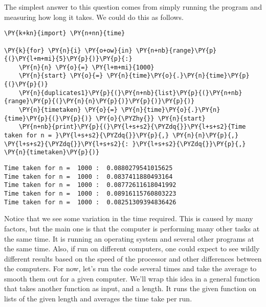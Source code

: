 The simplest answer to this question comes from simply running the program and measuring how long it takes.
We could do this as follows.


\begin{Verbatim}[commandchars=\\\{\}]
\PY{k+kn}{import} \PY{n+nn}{time}

\PY{k}{for} \PY{n}{i} \PY{o+ow}{in} \PY{n+nb}{range}\PY{p}{(}\PY{l+m+mi}{5}\PY{p}{)}\PY{p}{:}
    \PY{n}{n} \PY{o}{=} \PY{l+m+mi}{1000}
    \PY{n}{start} \PY{o}{=} \PY{n}{time}\PY{o}{.}\PY{n}{time}\PY{p}{(}\PY{p}{)}
    \PY{n}{duplicates1}\PY{p}{(}\PY{n+nb}{list}\PY{p}{(}\PY{n+nb}{range}\PY{p}{(}\PY{n}{n}\PY{p}{)}\PY{p}{)}\PY{p}{)}
    \PY{n}{timetaken} \PY{o}{=} \PY{n}{time}\PY{o}{.}\PY{n}{time}\PY{p}{(}\PY{p}{)} \PY{o}{\PYZhy{}} \PY{n}{start}
    \PY{n+nb}{print}\PY{p}{(}\PY{l+s+s2}{\PYZdq{}}\PY{l+s+s2}{Time taken for n = }\PY{l+s+s2}{\PYZdq{}}\PY{p}{,} \PY{n}{n}\PY{p}{,} \PY{l+s+s2}{\PYZdq{}}\PY{l+s+s2}{: }\PY{l+s+s2}{\PYZdq{}}\PY{p}{,} \PY{n}{timetaken}\PY{p}{)}
\end{Verbatim}

\begin{Verbatim}
Time taken for n =  1000 :  0.0880279541015625
Time taken for n =  1000 :  0.0837411880493164
Time taken for n =  1000 :  0.08772611618041992
Time taken for n =  1000 :  0.08916115760803223
Time taken for n =  1000 :  0.08251309394836426

\end{Verbatim}




Notice that we see some variation in the time required.
This is caused by many factors, but the main one is that the computer is performing many other tasks at the same time.
It is running an operating system and several other programs at the same time.
Also, if run on different computers, one could expect to see wildly different results based on the speed of the processor and other differences between the computers.
For now, let's run the code several times and take the average to smooth them out for a given computer.
We'll wrap this idea in a general function that takes another function as input, and a length.
It runs the given function on lists of the given length and averages the time take per run.

